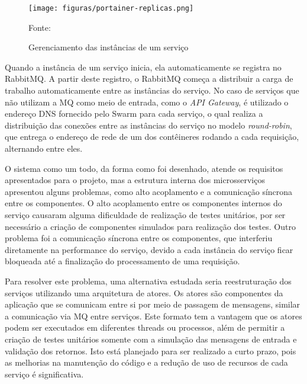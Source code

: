 \begin{figure}[H]
	\centering
	\caption{Gerenciamento das instâncias de um serviço}
	\texttt{[image: figuras/portainer-replicas.png]}

	\label{fig:portainer-replicas}
	\footnotesize Fonte: \fonteOAutor
\end{figure}

Quando a instância de um serviço inicia, ela automaticamente se registra
no RabbitMQ. A partir deste registro, o RabbitMQ começa a distribuir a carga
de trabalho automaticamente entre as instâncias do serviço. No caso de
serviços que não utilizam a \ac{MQ} como meio de entrada, como o
\emph{API Gateway}, é utilizado o endereço \ac{DNS} fornecido pelo Swarm
para cada serviço, o qual realiza a distribuição das conexões entre as
instâncias do serviço no modelo \emph{round-robin}, que entrega o
endereço de rede de um dos contêineres rodando a cada requisição, alternando
entre eles.

O sistema como um todo, da forma como foi desenhado, atende os requisitos
apresentados para o projeto, mas a estrutura interna dos microsserviços
apresentou alguns problemas, como alto acoplamento e a comunicação síncrona
entre os componentes. O alto acoplamento entre os componentes internos do
serviço causaram alguma dificuldade de realização de testes unitários, por
ser necessário a criação de componentes simulados para realização dos testes.
Outro problema foi a comunicação síncrona entre os componentes, que
interferiu diretamente na performance do serviço, devido a cada instância do
serviço ficar bloqueada até a finalização do processamento de uma requisição.

Para resolver este problema, uma alternativa estudada seria reestruturação
dos serviços utilizando uma arquitetura de atores. Os atores são componentes
da aplicação que se comunicam entre si por meio de passagem de mensagens,
similar a comunicação via \ac{MQ} entre serviços. Este formato tem a vantagem
que os atores podem ser executados em diferentes threads ou processos,
além de permitir a criação de testes unitários somente com a simulação das
mensagens de entrada e validação dos retornos. Isto está planejado para ser
realizado a curto prazo, pois as melhorias na manutenção do código e a
redução de uso de recursos de cada serviço é significativa.

